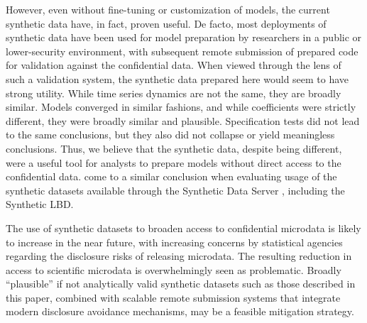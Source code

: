 However, even without  fine-tuning or customization of models, the current synthetic data have, in fact, proven useful. De facto, most deployments of synthetic data have been used for model preparation by researchers in a public or lower-security environment, with subsequent remote submission of prepared code for validation against the confidential data. When viewed through the lens of such a validation system, the synthetic data prepared here would seem to have strong utility. While time series dynamics are not the same, they are broadly similar. Models converged in similar fashions, and while coefficients were strictly different, they were broadly similar and plausible. Specification tests did not lead to the same conclusions, but they also did not collapse or yield meaningless conclusions. Thus, we believe that the synthetic data, despite being different, were a useful tool for analysts to prepare models without direct access to the confidential data. \textcite{VilhuberAbowd2016-SOLE,Vilhuber2019-SGP} come to a similar conclusion when evaluating usage of the synthetic datasets available through the Synthetic Data Server \citep{AbowdVilhuber2010}, including the Synthetic LBD.  
 
The use of synthetic datasets to broaden access to confidential microdata is likely to increase in the near future, with increasing concerns by statistical agencies regarding the disclosure risks of releasing microdata. The resulting reduction in access to scientific microdata is overwhelmingly seen as problematic. Broadly ``plausible'' if not analytically valid synthetic datasets such as those described in this paper, combined with scalable remote submission systems that integrate modern disclosure avoidance mechanisms, may be a feasible mitigation strategy. 
 




